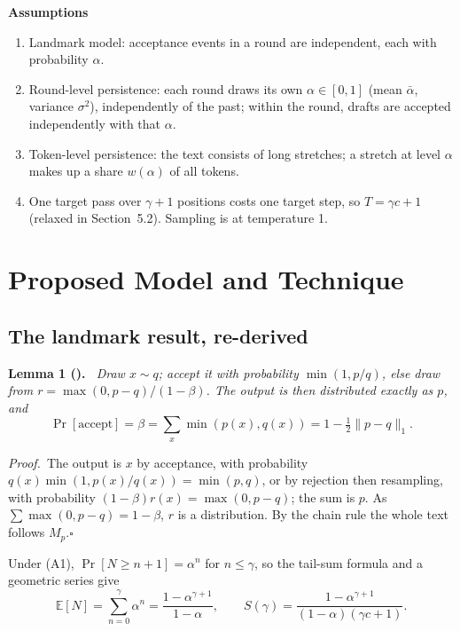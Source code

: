 \documentclass[11pt,letterpaper]{article}
\newenvironment{lem}[1]{\par\smallskip\noindent\textbf{Lemma #1.}\itshape\ }{\par\smallskip}
\newcommand{\pf}{\noindent\textit{Proof.}\ }
\newcommand{\qedbox}{\hfill$\square$}
\newcommand{\E}{\mathbb{E}}
\newcommand{\abar}{\bar\alpha}
\begin{document}
\smallskip\noindent\textbf{Assumptions}
\begin{enumerate}
\item[(A1)] Landmark model: acceptance events in a round are independent, each with probability $\alpha$.
\item[(A1$'$)] Round-level persistence: each round draws its own $\alpha\in[0,1]$ (mean $\abar$, variance $\sigma^2$), independently of the past; within the round, drafts are accepted independently with that $\alpha$.
\item[(A1$''$)] Token-level persistence: the text consists of long stretches; a stretch at level $\alpha$ makes up a share $w(\alpha)$ of all tokens.
\item[(A2)] One target pass over $\gamma+1$ positions costs one target step, so $T=\gamma c+1$ (relaxed in Section~5.2). Sampling is at temperature 1.
\end{enumerate}

\section{Proposed Model and Technique}
\subsection{The landmark result, re-derived}
\begin{lem}{1 (\cite{leviathan,chen})}
Draw $x\sim q$; accept it with probability $\min(1,p/q)$, else draw from $r=\max(0,p-q)/(1-\beta)$. The output is then distributed exactly as $p$, and
\begin{equation}
\Pr[\text{accept}]=\beta=\textstyle\sum_x\min(p(x),q(x))=1-\tfrac12\lVert p-q\rVert_1 .
\end{equation}
\end{lem}
\pf The output is $x$ by acceptance, with probability $q(x)\min(1,p(x)/q(x))=\min(p,q)$, or by rejection then resampling, with probability $(1-\beta)r(x)=\max(0,p-q)$; the sum is $p$. As $\sum\max(0,p-q)=1-\beta$, $r$ is a distribution. By the chain rule the whole text follows $M_p$.\qedbox

\smallskip
Under (A1), $\Pr[N\ge n+1]=\alpha^n$ for $n\le\gamma$, so the tail-sum formula and a geometric series give
\begin{equation}
\E[N]=\sum_{n=0}^{\gamma}\alpha^n=\frac{1-\alpha^{\gamma+1}}{1-\alpha},\qquad S(\gamma)=\frac{1-\alpha^{\gamma+1}}{(1-\alpha)(\gamma c+1)} .
\end{equation}
\end{document}
